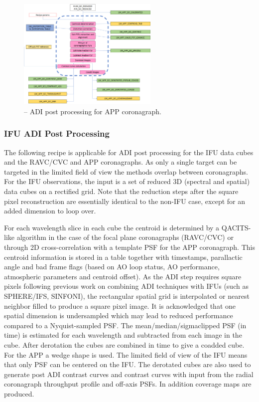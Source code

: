 \begin{figure}[hb]
  \centering
  \includegraphics[width=0.6\textwidth]{./figures/metis_lm_adi_app}
  \caption[Recipe: ]{ -- ADI post processing for APP coronagraph.
    }
  \label{fig:metis_det_adi_app}
\end{figure}



\subsubsection{IFU ADI Post Processing}
\label{sssec:adi_ifu}


The following recipe is applicable for ADI post processing for the IFU
data cubes and the RAVC/CVC and APP coronagraphs. As only a single
target can be targeted in the limited field of view the methods
overlap between coronagraphs.  For the IFU observations, the input is
a set of reduced 3D (spectral and spatial) data cubes on a rectified
grid. Note that the reduction steps after the square pixel reconstruction
are essentially identical to the non-IFU case, except for an added dimension
to loop over. 

For each wavelength slice in each cube the centroid is determined by a
QACITS-like algorithm in the case of the focal plane coronagraphs
(RAVC/CVC) or through 2D cross-correlation with a template PSF for the
APP coronagraph. This centroid information is stored in a table
together with timestamps, parallactic angle and bad frame flags (based
on AO loop status, AO performance, atmospheric parameters and centroid
offset).  As the ADI step requires square pixels following previous
work on combining ADI techniques with IFUs (such as SPHERE/IFS,
SINFONI), the rectangular spatial grid is interpolated or nearest
neighbor filled to produce a square pixel image.  It is acknowledged
that one spatial dimension is undersampled which may lead to reduced
performance compared to a Nyquist-sampled PSF.  The
mean/median/sigmaclipped PSF (in time) is estimated for each
wavelength and subtracted from each image in the cube.  After
derotation the cubes are combined in time to give a coadded cube. For
the APP a wedge shape is used. The limited field of view of the IFU
means that only PSF can be centered on the IFU. The derotated cubes
are also used to generate post ADI contrast curves and contrast curves
with input from the radial coronagraph throughput profile and off-axis
PSFs. In addition coverage maps are produced.

